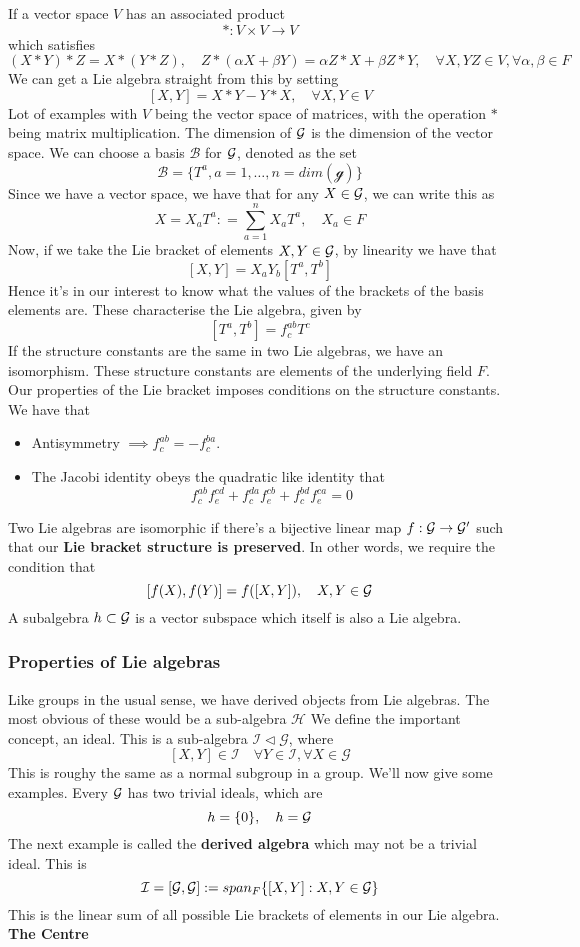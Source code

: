 If a vector space $V$ has an associated product 
\[ * : V \times V \rightarrow V \]
which satisfies 
\[ 
 ( X * Y) * Z  = X * ( Y * Z ), \quad Z * ( \alpha X + \beta Y ) = \alpha Z * X + \beta Z * Y, \quad  \forall X, Y Z \in V, \forall \alpha, \beta \in F \] 
We can get a Lie algebra straight from this by setting 
\[ 
	 [ X , Y ] = X * Y - Y * X, \quad \forall X, Y \in V 
\] Lot of examples with $ V $ being the vector space of matrices, with the operation $ * $ being matrix multiplication. The dimension of $\mathcal{ G }$ is the dimension of the vector space. We can choose a basis $\mathcal{ B }$ for $\mathcal{ G }$, denoted as the set 
\[ 
	 \mathcal{ B} = \{ T^ a, a = 1, \dots, n = dim ( \mathcal{ g } ) \} 
\] Since we have a vector space, we have that for any $X \in \mathcal{ G }$, we can write this as 
\[ 
 	X  = X_a T^a  : = \sum_{ a = 1}^n X_a T^a, \quad X_a \in F 
\] Now, if we take the Lie bracket of elements $ X, Y \in \mathcal{ G }$, by linearity we have that 
\[
	[X, Y ] = X_a Y_b [ T^a , T^b ]
\] Hence it's in our interest to know what the values of the brackets of the basis elements are. These characterise the Lie algebra, given by 
\[ 
	 [ T^a, T^b ] = f^{ ab }_c T^c 
\] If the structure constants are the same in two Lie algebras, we have an isomorphism. These structure constants are elements of the underlying field $ F$. Our properties of the Lie bracket imposes conditions on the structure constants. We have that 
\begin{itemize} 
	\item Antisymmetry $ \implies f^{ ab}_c =  - f^{ ba }_c $. 
	\item The Jacobi identity obeys the quadratic like identity that 
	\[ 
		 f^{ ab}_c f^{ cd}_e + f^{da}_c f^{ cb}_e + f^{ bd}_c f^{ ca}_e  =0 
	\] 
\end{itemize} 
Two Lie algebras are isomorphic if there's a bijective linear map $ f: \mathcal{ G } \rightarrow \mathcal{ G }' $ such that our \textbf{Lie bracket structure is preserved}. In other words, we require the condition that 
\[
	 [ f( X), f( Y) ] = f ( [ X, Y ] ), \quad X, Y \in \mathcal{ G }
\] 
A subalgebra $h \subset \mathcal{ G } $ is a vector subspace which itself is also a Lie algebra. 

\subsubsection{Properties of Lie algebras}
Like groups in the usual sense, we have derived objects from Lie algebras. The most obvious of these would be a sub-algebra $\mathcal{H}$ We define the important concept, an ideal. This is a sub-algebra $\mathcal{I} \triangleleft \mathcal{G} $, where 
\[ 
	[X, Y] \in \mathcal{I} \quad \forall Y \in \mathcal{I}, \forall X \in \mathcal{G}
\] This is roughy the same as a normal subgroup in a group. We'll now give some examples. Every $\mathcal{ G }$ has two trivial ideals, which are 
\[ 
 	h = \{ 0 \}, \quad h = \mathcal{ G }
\] 
The next example is called the \textbf{derived algebra} which may not be a trivial ideal. This is 
\[ 
 	\mathcal{I } = [ \mathcal{ G }, \mathcal{ G } ] : = span_F \{ [ X, Y ] : X, Y \in \mathcal{ G } \} 
\] This is the linear sum of all possible Lie brackets of elements in our Lie algebra. 
\textbf{The Centre}


